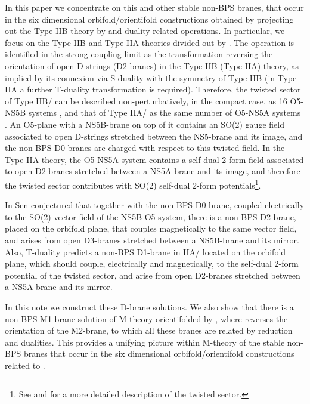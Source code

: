 \documentclass[12pt,a4paper]{article}
\begin{document}
In this paper we concentrate on this and other stable non-BPS
branes, that occur in the six dimensional orbifold/orientifold
constructions obtained by projecting out the Type IIB theory
by \coordHE{} and duality-related operations. In particular,
we focus on the Type IIB and Type IIA theories divided out by
\coordHE{}. The \coordHE{} operation is identified in the
strong coupling limit as the transformation reversing the orientation
of open D-strings (D2-branes) in the Type IIB (Type IIA) theory,
as implied by its connexion via S-duality 
with the \myHighlight{$\Omega$}\coordHE{} symmetry of Type IIB \cite{Sen**}
(in Type IIA a further T-duality transformation is required).
Therefore, the twisted sector of Type IIB/\coordHE{} 
can be described non-perturbatively, in the compact case, as
16 O5-NS5B systems \cite{Kuta,MS}, and that of Type IIA/\coordHE{}
as the same number of O5-NS5A systems \cite{Kuta}. 
An O5-plane with a NS5B-brane on top of it contains an SO(2)
gauge field associated to open D-strings stretched between the 
NS5-brane and its image,
and the non-BPS D0-branes are charged with respect to this twisted
field. In the Type IIA theory, the O5-NS5A system contains a
self-dual 2-form field associated to open D2-branes stretched between
a NS5A-brane and its image, 
and therefore the twisted sector contributes with 
SO(2) self-dual 2-form potentials\footnote{See \cite{Kuta} and
\cite{DM,W} for a more detailed description of the twisted sector.}.

In \cite{Senrev} Sen conjectured that together with the non-BPS D0-brane, 
coupled electrically
to the SO(2) vector field of the NS5B-O5 system, there is 
a non-BPS D2-brane, placed on the orbifold plane, that couples 
magnetically to the same vector field,
and arises from open D3-branes stretched between a NS5B-brane and
its mirror.
Also, T-duality predicts a non-BPS D1-brane in  
IIA/\coordHE{} located on the orbifold plane, which should couple,
electrically and magnetically, to the self-dual 2-form potential of
the twisted sector, and arise from open D2-branes stretched between
a NS5A-brane and its mirror.

In this note we construct these D-brane solutions. We also show that
there is a non-BPS M1-brane solution of M-theory orientifolded by
\coordHE{} \cite{DM,W},
where \myHighlight{$\Omega_\rho$}\coordHE{} reverses the orientation of 
the M2-brane, to which all these branes are related by reduction
and dualities. This provides a unifying picture within M-theory
of the stable non-BPS branes that occur in the six dimensional
orbifold/orientifold constructions related to \coordHE{}. 
\end{document}
